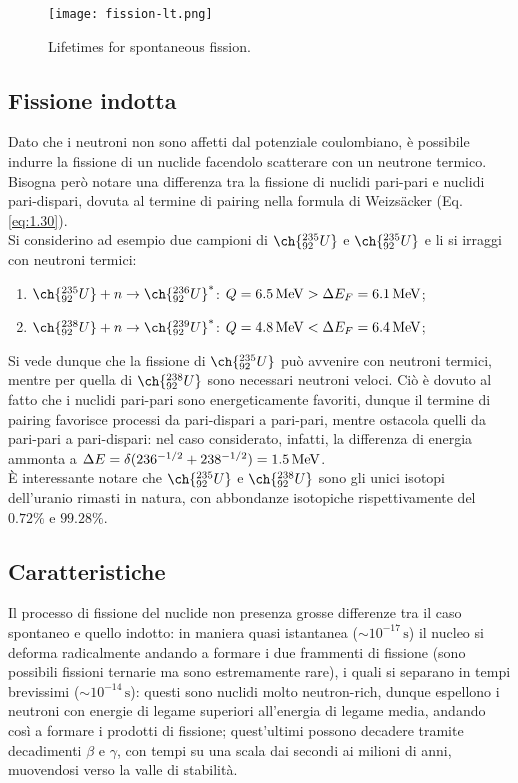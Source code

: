 \begin{figure}[!hb]
	\centering
	\texttt{[image: fission-lt.png]}
	\caption{Lifetimes for spontaneous fission.}
	\label{fission-lt}
\end{figure}

\subsection{Fissione indotta}

Dato che i neutroni non sono affetti dal potenziale coulombiano, è possibile indurre la fissione di un nuclide facendolo scatterare con un neutrone termico. Bisogna però notare una differenza tra la fissione di nuclidi pari-pari e nuclidi pari-dispari, dovuta al termine di pairing nella formula di Weizsäcker (Eq. \ref{eq:1.30}).\\
Si considerino ad esempio due campioni di $ \ch{^{235}_{92} U} $ e $ \ch{^{235}_{92} U} $ e li si irraggi con neutroni termici:
\begin{enumerate}
	\item $ \ch{^{235}_{92} U} + n \rightarrow \ch{^{236}_{92} U}^* $: $ Q = 6.5\,\mathrm{MeV} > \Delta E_F = 6.1\,\mathrm{MeV} $;
	\item $ \ch{^{238}_{92} U} + n \rightarrow \ch{^{239}_{92} U}^* $: $ Q = 4.8\,\mathrm{MeV} < \Delta E_F = 6.4\,\mathrm{MeV} $;
\end{enumerate}
Si vede dunque che la fissione di $ \ch{^{235}_{92} U} $ può avvenire con neutroni termici, mentre per quella di $ \ch{^{238}_{92} U} $ sono necessari neutroni veloci. Ciò è dovuto al fatto che i nuclidi pari-pari sono energeticamente favoriti, dunque il termine di pairing favorisce processi da pari-dispari a pari-pari, mentre ostacola quelli da pari-pari a pari-dispari: nel caso considerato, infatti, la differenza di energia ammonta a $ \Delta E = \delta (236^{-1/2} + 238^{-1/2}) = 1.5\,\mathrm{MeV} $.\\
È interessante notare che $ \ch{^{235}_{92} U} $ e $ \ch{^{238}_{92} U} $ sono gli unici isotopi dell'uranio rimasti in natura, con abbondanze isotopiche rispettivamente del $ 0.72\% $ e $ 99.28\% $.

\subsection{Caratteristiche}

Il processo di fissione del nuclide non presenza grosse differenze tra il caso spontaneo e quello indotto: in maniera quasi istantanea ($ \sim 10^{-17}\,\text{s} $) il nucleo si deforma radicalmente andando a formare i due frammenti di fissione (sono possibili fissioni ternarie ma sono estremamente rare), i quali si separano in tempi brevissimi ($ \sim 10^{-14}\,\text{s} $): questi sono nuclidi molto neutron-rich, dunque espellono i neutroni con energie di legame superiori all'energia di legame media, andando così a formare i prodotti di fissione; quest'ultimi possono decadere tramite decadimenti $ \beta $ e $ \gamma $, con tempi su una scala dai secondi ai milioni di anni, muovendosi verso la valle di stabilità.

